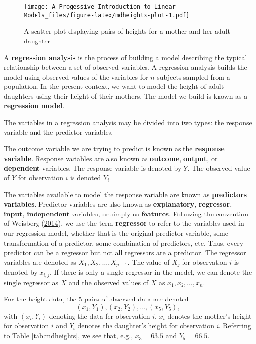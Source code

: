 \documentclass[
]{book}
\theoremstyle{definition}
\theoremstyle{definition}
\theoremstyle{definition}
\theoremstyle{definition}
\theoremstyle{remark}
\begin{document}
\begin{figure}
\centering
\texttt{[image: A-Progessive-Introduction-to-Linear-Models\_files/figure-latex/mdheights-plot-1.pdf]}
\caption{\label{fig:mdheights-plot}A scatter plot displaying pairs of heights for a mother and her adult daughter.}
\end{figure}

A \textbf{regression analysis} is the process of building a model describing the typical relationship between a set of observed variables. A regression analysis builds the model using observed values of the variables for \(n\) subjects sampled from a population. In the present context, we want to model the height of adult daughters using their height of their mothers. The model we build is known as a \textbf{regression model}.

The variables in a regression analysis may be divided into two types: the response variable and the predictor variables.

The outcome variable we are trying to predict is known as the \textbf{response variable}. Response variables are also known as \textbf{outcome}, \textbf{output}, or \textbf{dependent} variables. The response variable is denoted by \(Y\). The observed value of \(Y\) for observation \(i\) is denoted \(Y_i\).

The variables available to model the response variable are known as \textbf{predictors variables}. Predictor variables are also known as \textbf{explanatory}, \textbf{regressor}, \textbf{input}, \textbf{independent} variables, or simply as \textbf{features}. Following the convention of Weisberg (\protect\hyperlink{ref-alr4}{2014}), we use the term \textbf{regressor} to refer to the variables used in our regression model, whether that is the original predictor variable, some transformation of a predictor, some combination of predictors, etc. Thus, every predictor can be a regressor but not all regressors are a predictor. The regressor variables are denoted as \(X_1, X_2, \ldots, X_{p-1}\). The value of \(X_j\) for observation \(i\) is denoted by \(x_{i,j}\). If there is only a single regressor in the model, we can denote the single regressor as \(X\) and the observed values of \(X\) as \(x_1, x_2, \ldots, x_n\).

For the height data, the 5 pairs of observed data are denoted
\[(x_1, Y_1), (x_2, Y_2), \ldots, (x_5, Y_5),\]
with \((x_i, Y_i)\) denoting the data for observation \(i\). \(x_i\) denotes the mother's height for observation \(i\) and \(Y_i\) denotes the daughter's height for
observation \(i\). Referring to Table \ref{tab:mdheights}, we see that, e.g., \(x_3 = 63.5\) and \(Y_5= 66.5\).
\end{document}

